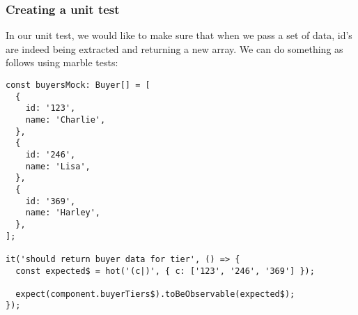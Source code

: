\subsubsection{Creating a unit test}
In our unit test, we would like to make sure that when we pass a set of data,
id's are indeed being extracted and returning a new array. We can do something
as follows using marble tests:

\begin{lstlisting}
const buyersMock: Buyer[] = [
  {
    id: '123',
    name: 'Charlie',
  },
  {
    id: '246',
    name: 'Lisa',
  },
  {
    id: '369',
    name: 'Harley',
  },
];

it('should return buyer data for tier', () => {
  const expected$ = hot('(c|)', { c: ['123', '246', '369'] });

  expect(component.buyerTiers$).toBeObservable(expected$);
});
\end{lstlisting}

